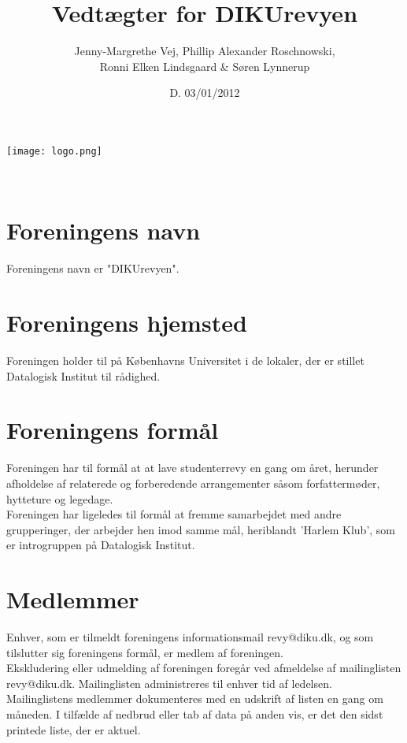 \documentclass[a4paper,11pt,danish]{article}
\title{Vedtægter for DIKUrevyen}
\author{Jenny-Margrethe Vej, Phillip Alexander Roschnowski, \\Ronni Elken Lindsgaard \& Søren Lynnerup}
\date{D. 03/01/2012}
\begin{document}
\maketitle

\begin{center}
    \texttt{[image: logo.png]}
\end{center}\\


\newpage

\section{Foreningens navn}
Foreningens navn er "DIKUrevyen".


\section{Foreningens hjemsted}
Foreningen holder til på Københavns Universitet i de lokaler, der er stillet Datalogisk Institut til rådighed. 

\section{Foreningens formål}
Foreningen har til formål at at lave studenterrevy en gang om året, herunder afholdelse af relaterede og forberedende arrangementer såsom forfattermøder, hytteture og legedage. \\

\noindent Foreningen har ligeledes til formål at fremme samarbejdet med andre grupperinger, der arbejder hen imod samme mål, heriblandt 'Harlem Klub', som er introgruppen på Datalogisk Institut.  

\section{Medlemmer}
Enhver, som er tilmeldt foreningens informationsmail revy@diku.dk, og som tilslutter sig foreningens formål, er medlem af foreningen.\\

\noindent Ekskludering eller udmelding af foreningen foregår ved afmeldelse af mailinglisten revy@diku.dk. Mailinglisten administreres til enhver tid af ledelsen. \\

\noindent Mailinglistens medlemmer dokumenteres med en udskrift af listen en gang om måneden. I tilfælde af nedbrud eller tab af data på anden vis, er det den sidst printede liste, der er aktuel.
\end{document}

